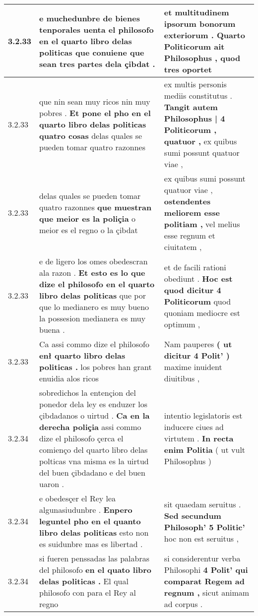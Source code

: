 \begin{tabular}{|p{1cm}|p{6.5cm}|p{6.5cm}|}
3.2.33 & e muchedunbre de bienes tenporales \textbf{ uenta el philosofo en el quarto libro delas politicas } que conuiene que sean tres partes dela çibdat . & et multitudinem ipsorum bonorum exteriorum . \textbf{ Quarto Politicorum ait Philosophus , } quod tres oportet \\\hline
3.2.33 & que nin sean muy ricos nin muy pobres . \textbf{ Et pone el pho en el quarto libro delas politicas quatro cosas } delas quales se pueden tomar quatro razonnes & ex multis personis mediis constitutus . \textbf{ Tangit autem Philosophus | 4 Politicorum , quatuor , } ex quibus sumi possunt quatuor viae , \\\hline
3.2.33 & delas quales se pueden tomar quatro razonnes \textbf{ que muestran que meior es la poliçia } o meior es el regno o la çibdat & ex quibus sumi possunt quatuor viae , \textbf{ ostendentes meliorem esse politiam , } vel melius esse regnum et ciuitatem , \\\hline
3.2.33 & e de ligero los omes obedescran ala razon . \textbf{ Et esto es lo que dize el philosofo en el quarto libro delas politicas } que por que lo medianero es muy bueno la possesion medianera es muy buena . & et de facili rationi obediunt . \textbf{ Hoc est quod dicitur 4 Politicorum } quod quoniam mediocre est optimum , \\\hline
3.2.33 & Ca assi commo dize el philosofo \textbf{ enł quarto libro delas politicas . } los pobres han grant enuidia alos ricos & Nam pauperes \textbf{ ( ut dicitur 4 Polit’ ) } maxime inuident diuitibus , \\\hline
3.2.34 & sobredichos la entençion del ponedor dela ley es enduzer los çibdadanos o uirtud . \textbf{ Ca en la derecha poliçia } assi commo dize el philosofo çerca el comienço del quarto libro delas polticas vna misma es la uirtud del buen çibdadano e del buen uaron . & intentio legislatoris est inducere ciues ad virtutem . \textbf{ In recta enim Politia } ( ut vult Philosophus ) \\\hline
3.2.34 & e obedesçer el Rey lea algunasiudunbre . \textbf{ Enpero leguntel pho en el quanto libro delas politicas } esto non es suidunbre mas es libertad . & sit quaedam seruitus . \textbf{ Sed secundum Philosoph’ 5 Politic’ } hoc non est seruitus , \\\hline
3.2.34 & si fueren penssadas las palabras del philosofo \textbf{ en el quato libro delas politicas . } El qual philosofo con para el Rey al regno & si considerentur verba Philosophi \textbf{ 4 Polit’ qui comparat Regem ad regnum , } sicut animam ad corpus . \\\hline

\end{tabular}
